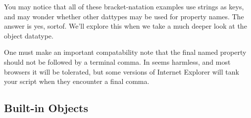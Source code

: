 \documentclass[11pt,letter]{book}
\begin{document}
    You may notice that all of these bracket-natation examples use strings as keys, and may wonder
    whether other dattypes may be used for property names. The answer is yes, sortof. We'll explore 
    this when we take a much deeper look at the object datatype.
    
    One must make an important compatability note that the final named property should not be 
    followed by a terminal comma. In seems harmless, and most browsers it will be tolerated, but 
    some versions of Internet Explorer will tank your script when they encounter a final comma.
    
    \subsection{Built-in Objects}
    
    
    
\end{document}
